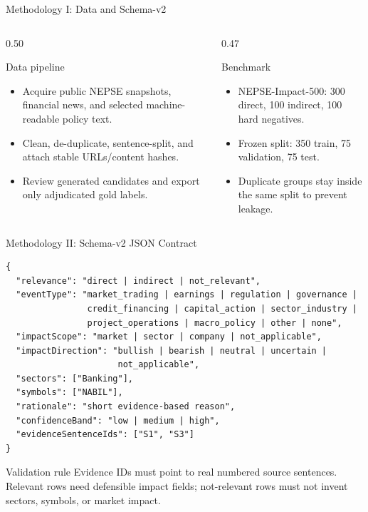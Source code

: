 \documentclass[aspectratio=169,11pt]{beamer}
\begin{document}
\begin{frame}{Methodology I: Data and Schema-v2}
  \begin{columns}[T,onlytextwidth]
    \begin{column}{0.50\textwidth}
      \begin{block}{Data pipeline}
        \begin{itemize}
          \item Acquire public NEPSE snapshots, financial news, and selected machine-readable policy text.
          \item Clean, de-duplicate, sentence-split, and attach stable URLs/content hashes.
          \item Review generated candidates and export only adjudicated gold labels.
        \end{itemize}
      \end{block}
    \end{column}
    \begin{column}{0.47\textwidth}
      \begin{block}{Benchmark}
        \begin{itemize}
          \item NEPSE-Impact-500: 300 direct, 100 indirect, 100 hard negatives.
          \item Frozen split: 350 train, 75 validation, 75 test.
          \item Duplicate groups stay inside the same split to prevent leakage.
        \end{itemize}
      \end{block}
    \end{column}
  \end{columns}
\end{frame}

\begin{frame}[fragile]{Methodology II: Schema-v2 JSON Contract}
  \scriptsize
  \begin{verbatim}
{
  "relevance": "direct | indirect | not_relevant",
  "eventType": "market_trading | earnings | regulation | governance |
                credit_financing | capital_action | sector_industry |
                project_operations | macro_policy | other | none",
  "impactScope": "market | sector | company | not_applicable",
  "impactDirection": "bullish | bearish | neutral | uncertain |
                      not_applicable",
  "sectors": ["Banking"],
  "symbols": ["NABIL"],
  "rationale": "short evidence-based reason",
  "confidenceBand": "low | medium | high",
  "evidenceSentenceIds": ["S1", "S3"]
}
  \end{verbatim}
  \vspace{-0.05cm}
  \begin{block}{Validation rule}
    Evidence IDs must point to real numbered source sentences. Relevant rows need defensible impact fields; not-relevant rows must not invent sectors, symbols, or market impact.
  \end{block}
\end{frame}
\end{document}
